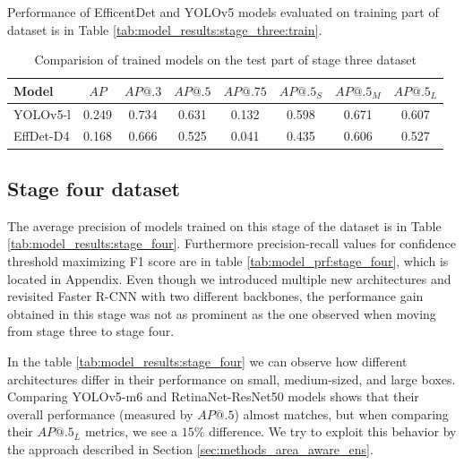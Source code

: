 Performance of EfficentDet and YOLOv5 models evaluated on training part of dataset is in Table \ref{tab:model_results:stage_three:train}.

\begin{table}[H]
    \centering
    \begin{tabular}{|l|c|c|c|c|c|c|c|}
        \hline
        Model     & $AP$  & $AP@.3$ & $AP@.5$ & $AP@.75$ & $AP@.5_S$ & $AP@.5_M$ & $AP@.5_L$ \\ \hline
        YOLOv5-l  & 0.249 & 0.734   & 0.631   & 0.132    & 0.598     & 0.671     & 0.607     \\ \hline
        EffDet-D4 & 0.168 & 0.666   & 0.525   & 0.041    & 0.435     & 0.606     & 0.527     \\ \hline
    \end{tabular}
    \caption{Comparision of trained models on the test part of stage three dataset}
    \label{tab:model_results:stage_three:test}
\end{table}

\subsection{Stage four dataset}
The average precision of models trained on this stage of the dataset is in Table \ref{tab:model_results:stage_four}. Furthermore precision-recall values for confidence threshold maximizing F1 score are in table \ref{tab:model_prf:stage_four}, which is located in Appendix. Even though we introduced multiple new architectures and revisited Faster R-CNN with two different backbones, the performance gain obtained in this stage was not as prominent as the one observed when moving from stage three to stage four.

In the table \ref{tab:model_results:stage_four} we can observe how different architectures differ in their performance on small, medium-sized, and large boxes. Comparing YOLOv5-m6 and RetinaNet-ResNet50 models shows that their overall performance (measured by $AP@.5$) almost matches, but when comparing their $AP@.5_L$ metrics, we see a $15\%$ difference. We try to exploit this behavior by the approach described in Section \ref{sec:methods_area_aware_ens}.

